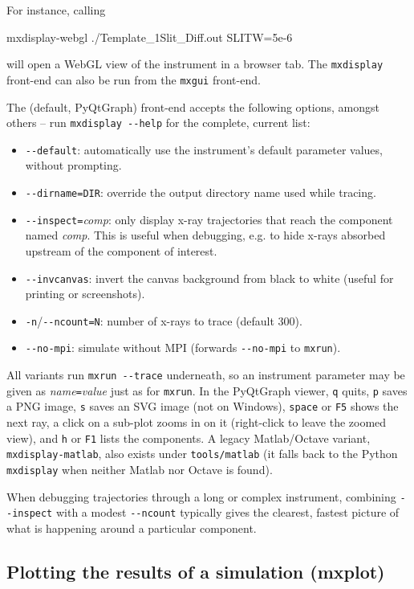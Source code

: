 For instance, calling
\begin{bash}
mxdisplay-webgl ./Template_1Slit_Diff.out SLITW=5e-6
\end{bash}
will open a WebGL view of the instrument in a browser tab.
The \verb+mxdisplay+ front-end can also be run from the \verb+mxgui+ front-end.

The (default, PyQtGraph) front-end accepts the following options, amongst
others -- run \verb+mxdisplay --help+ for the complete, current list:
\begin{itemize}
\item \verb+--default+: automatically use the instrument's default parameter
  values, without prompting.
\item \verb+--dirname=DIR+: override the output directory name used while
  tracing.
\item \verb+--inspect=+\textit{comp}: only display x-ray trajectories that
  reach the component named \textit{comp}. This is useful when debugging, e.g.
  to hide x-rays absorbed upstream of the component of interest.
\item \verb+--invcanvas+: invert the canvas background from black to white
  (useful for printing or screenshots).
\item \verb+-n+/\verb+--ncount=N+: number of x-rays to trace (default 300).
\item \verb+--no-mpi+: simulate without MPI (forwards \verb+--no-mpi+ to
  \verb+mxrun+).
\end{itemize}
All variants run \verb+mxrun --trace+ underneath, so an instrument parameter
may be given as \textit{name}\verb+=+\textit{value} just as for \verb+mxrun+.
In the PyQtGraph viewer, \texttt{q} quits, \texttt{p} saves a PNG image,
\texttt{s} saves an SVG image (not on Windows), \texttt{space} or \texttt{F5}
shows the next ray, a click on a sub-plot zooms in on it (right-click to leave
the zoomed view), and \texttt{h} or \texttt{F1} lists the components.
A legacy Matlab/Octave variant, \verb+mxdisplay-matlab+, also exists under
\texttt{tools/matlab} (it falls back to the Python \verb+mxdisplay+ when
neither Matlab nor Octave is found).

When debugging trajectories through a long or complex instrument, combining
\verb+--inspect+ with a modest \verb+--ncount+ typically gives the clearest,
fastest picture of what is happening around a particular component.

\subsection{Plotting the results of a simulation (mxplot)}
\label{s:mxplot}

